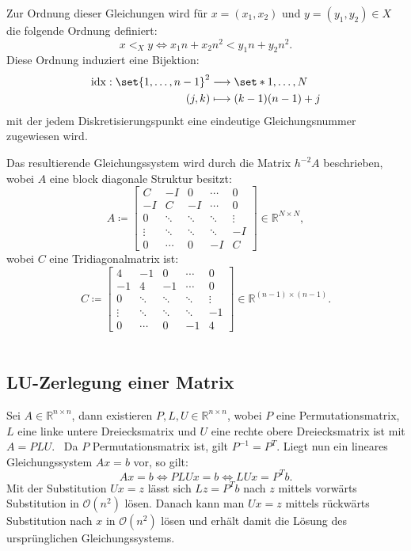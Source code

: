 \documentclass{scrartcl}
\newcommand\R{\mathbb{R}}
\newcommand\BigO{\mathcal{O}}
\begin{document}
Zur Ordnung dieser Gleichungen wird für \(x = (x_1, x_2)\) und \(y = (y_1, y_2)
\in X\) die folgende Ordnung definiert:
\[
    x <_{X} y \iff x_1n + x_2n^2 < y_1n + y_2n^2.
\]
Diese Ordnung induziert eine Bijektion:
\begin{align*}
    \operatorname{idx}: \set{1, \ldots, n - 1}^2 & \longrightarrow \set*{1, \ldots , N} \\
    (j, k)                                       & \longmapsto (k - 1)(n - 1) + j
\end{align*}
mit der jedem Diskretisierungspunkt eine eindeutige Gleichungsnummer
zugewiesen wird.

Das resultierende Gleichungssystem wird durch die Matrix \(h^{-2}A\)
beschrieben, wobei \(A\) eine block diagonale Struktur besitzt:
\[
    A \coloneq \begin{bmatrix}
        C      & -I     & 0      & \cdots & 0      \\
        -I     & C      & -I     & \cdots & 0      \\
        0      & \ddots & \ddots & \ddots & \vdots \\
        \vdots & \ddots & \ddots & \ddots & -I     \\
        0      & \cdots & 0      & -I     & C
    \end{bmatrix}
    \in \R^{N \times N},
\]
wobei \(C\) eine Tridiagonalmatrix ist:
\[
    C \coloneq \begin{bmatrix}
        4      & -1     & 0      & \cdots & 0      \\
        -1     & 4      & -1     & \cdots & 0      \\
        0      & \ddots & \ddots & \ddots & \vdots \\
        \vdots & \ddots & \ddots & \ddots & -1     \\
        0      & \cdots & 0      & -1     & 4
    \end{bmatrix}
    \in \R^{(n-1) \times (n-1)}.
\]
~\cite{PPI_Poisson}

\subsection{LU-Zerlegung einer Matrix}

Sei \(A \in \R^{n \times n}\), dann existieren \(P, L, U \in \R^{n \times n}\),
wobei \(P\) eine Permutationsmatrix, \(L\) eine linke untere Dreiecksmatrix und
\(U\) eine rechte obere Dreiecksmatrix ist mit \(A = PLU\).\ \cite{LU} Da \(P\)
Permutationsmatrix ist, gilt \(P^{-1} = P^T\). Liegt nun ein lineares
Gleichungssystem \(Ax = b\) vor, so gilt:
\[
    Ax = b \iff PLUx = b \iff LUx = P^T b.
\]
Mit der Substitution \(Ux = z\) lässt sich \(Lz = P^{T}b\) nach \(z\) mittels
  vorwärts Substitution in \(\BigO(n^2)\) lösen. Danach kann man \(Ux = z\)
  mittels rückwärts Substitution nach \(x\) in \(\BigO(n^2)\) lösen und erhält
  damit die Lösung des ursprünglichen Gleichungssystems.
\end{document}

